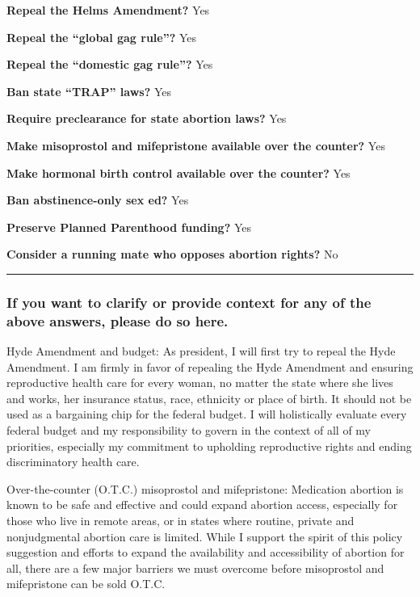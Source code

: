 \textbf{Repeal the Helms Amendment?} Yes

\textbf{Repeal the ``global gag rule''?} Yes

\textbf{Repeal the ``domestic gag rule''?} Yes

\textbf{Ban state ``TRAP'' laws?} Yes

\textbf{Require preclearance for state abortion laws?} Yes

\textbf{Make misoprostol and mifepristone available over the counter?}
Yes

\textbf{Make hormonal birth control available over the counter?} Yes

\textbf{Ban abstinence-only sex ed?} Yes

\textbf{Preserve Planned Parenthood funding?} Yes

\textbf{Consider a running mate who opposes abortion rights?} No

\begin{center}\rule{0.5\linewidth}{\linethickness}\end{center}

\hypertarget{if-you-want-to-clarify-or-provide-context-for-any-of-the-above-answers-please-do-so-here-2}{%
\subsubsection{If you want to clarify or provide context for any of the
above answers, please do so
here.}\label{if-you-want-to-clarify-or-provide-context-for-any-of-the-above-answers-please-do-so-here-2}}

Hyde Amendment and budget: As president, I will first try to repeal the
Hyde Amendment. I am firmly in favor of repealing the Hyde Amendment and
ensuring reproductive health care for every woman, no matter the state
where she lives and works, her insurance status, race, ethnicity or
place of birth. It should not be used as a bargaining chip for the
federal budget. I will holistically evaluate every federal budget and my
responsibility to govern in the context of all of my priorities,
especially my commitment to upholding reproductive rights and ending
discriminatory health care.

Over-the-counter (O.T.C.) misoprostol and mifepristone: Medication
abortion is known to be safe and effective and could expand abortion
access, especially for those who live in remote areas, or in states
where routine, private and nonjudgmental abortion care is limited. While
I support the spirit of this policy suggestion and efforts to expand the
availability and accessibility of abortion for all, there are a few
major barriers we must overcome before misoprostol and mifepristone can
be sold O.T.C.

